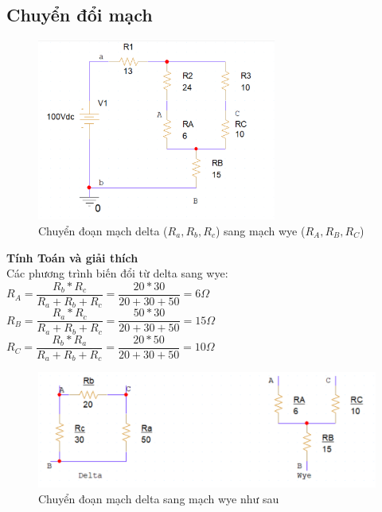 \subsection{Chuyển đổi mạch}
\begin{figure}[!htbp]
    \centering
    \includegraphics[width=0.7\textwidth]{graphics/ex6/f2.png}
    \caption{Chuyển đoạn mạch delta (\(R_a, R_b, R_c\)) sang mạch wye (\(R_A, R_B, R_C\))}
    \end{figure}
\begin{center}
    \textbf{Tính Toán và giải thích}\\
    Các phương trình biến đổi từ delta sang wye:\\
    \(R_A = \dfrac{R_b*R_c}{R_a + R_b + R_c} = \dfrac{20*30}{20 + 30 + 50} = 6 \Omega\)\\
    \(R_B = \dfrac{R_a*R_c}{R_a + R_b + R_c} = \dfrac{50*30}{20 + 30 + 50} = 15 \Omega\)\\
    \(R_C = \dfrac{R_b*R_a}{R_a + R_b + R_c} = \dfrac{20*50}{20 + 30 + 50} = 10 \Omega\)\\
\end{center}
\begin{figure}[!htbp]
    \centering
    \includegraphics[width=1\textwidth]{graphics/ex6/f7.png}
    \caption{Chuyển đoạn mạch delta sang mạch wye như sau}
    \end{figure}
    
